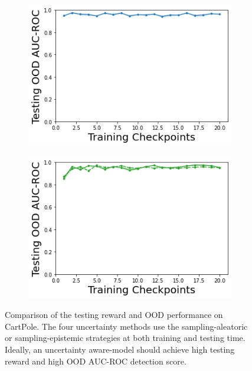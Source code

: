 \begin{figure}
\begin{subfigure}{.245\textwidth}
        \includegraphics[width=\textwidth]{sections/011_icml2022/resources/DKL-CartPoleOOD-v0-AUC-ROC-epistemic_-testing-strategy.png}
    \end{subfigure}
    \begin{subfigure}{.245\textwidth}
        \includegraphics[width=\textwidth]{sections/011_icml2022/resources/PostNet-CartPoleOOD-v0-AUC-ROC-epistemic_-testing-strategy.png}
    \end{subfigure}
    \caption{Comparison of the testing reward and OOD performance on CartPole. The four uncertainty methods use the sampling-aleatoric or sampling-epistemic strategies at both training and testing time. Ideally, an uncertainty aware-model should achieve high testing reward and high OOD AUC-ROC detection score.}
    \label{fig:strategy-testing-performance-cartpole}
\end{figure}